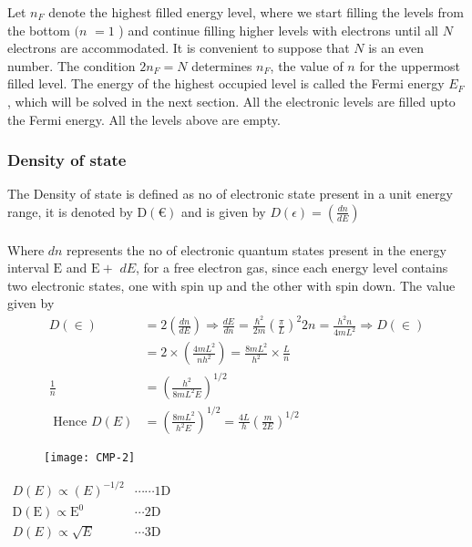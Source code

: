 Let $n_{F}$ denote the highest filled energy level, where we start filling the levels from the bottom $(n$ $=1$ ) and continue filling higher levels with electrons until all $N$ electrons are accommodated. It is convenient to suppose that $N$ is an even number. The condition $2 n_{F}=N$ determines $n_{F}$, the value of $n$ for the uppermost filled level. The energy of the highest occupied level is called the Fermi energy $E_{F}$, which will be solved in the next section. All the electronic levels are filled upto the Fermi energy. All the levels above are empty.
\subsubsection{Density of state}
 The Density of state is defined as no of electronic state present in a unit energy range, it is denoted by $\mathrm{D}(€)$ and is given by $D(\epsilon)=\left(\frac{d n}{d E}\right)$\\\\
Where $d n$ represents the no of electronic quantum states present in the energy interval $\mathrm{E}$ and $\mathrm{E}+$ $d E$, for a free electron gas, since each energy level contains two electronic states, one with spin up and the other with spin down. The value given by
\begin{align*}
D(\in)&=2\left(\frac{d n}{d E}\right) \Rightarrow \frac{d E}{d n}=\frac{\hbar^{2}}{2 m}\left(\frac{\pi}{L}\right)^{2} 2 n=\frac{h^{2} n}{4 m L^{2}} \Rightarrow D(\in)\\
&=2 \times\left(\frac{4 m L^{2}}{n h^{2}}\right)=\frac{8 m L^{2}}{h^{2}} \times \frac{L}{n}\\
\frac{1}{n}&=\left(\frac{h^{2}}{8 m L^{2} E}\right)^{1 / 2}\\
\text { Hence } D(E)&=\left(\frac{8 m L^{2}}{h^{2} E}\right)^{1 / 2}=\frac{4 L}{h}\left(\frac{m}{2 E}\right)^{1 / 2}
\end{align*}
\begin{figure}[H]
	\centering
	\texttt{[image: CMP-2]}
\end{figure}
\begin{note}
	$\begin{array}{lr}D(E) \propto(E)^{-1 / 2} & \cdots \cdots 1 \mathrm{D} \\ \mathrm{D}(\mathrm{E}) \propto \mathrm{E}^{0} & \cdots2 \mathrm{D} \\ D(E) \propto \sqrt{E} & \cdots3 \mathrm{D}\end{array}$
\end{note}
